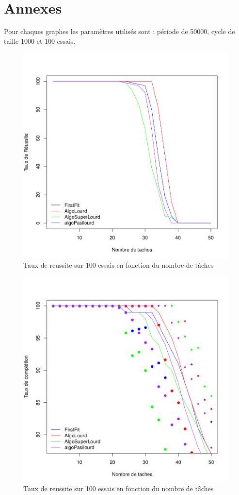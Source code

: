 \documentclass[11pt]{article}
\begin{document}
\section{Annexes}
Pour chaques graphes les paramètres utilisés sont : période de 50000, cycle de taille 1000 et 100 essais.
\begin{figure}[!ht]
    \center
    \includegraphics[scale = 0.5]{taux_reussite}
    \caption{Taux de reussite sur 100 essais en fonction du nombre de tâches}
\end{figure} 
\begin{figure}[!ht]
    \center
    \includegraphics[scale = 0.5]{taux_completion}
    \caption{Taux de reussite sur 100 essais en fonction du nombre de tâches}
\end{figure}
\end{document}
